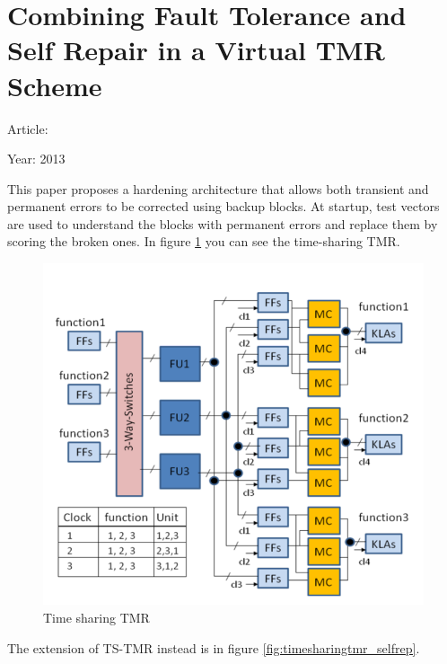 {	\section{Combining Fault Tolerance and Self Repair in a Virtual TMR Scheme}{
		Article: \cite{Combining_FT_and_self_repairing_virtual_TMR}
		
		Year: 2013
		
		This paper proposes a hardening architecture that allows both transient and permanent errors to be corrected using backup blocks. At startup, test vectors are used to understand the blocks with permanent errors and replace them by scoring the broken ones. In figure \ref{fig:timesharingtmr} you can see the time-sharing TMR.
		\begin{figure}[H]
			\centering
			\includegraphics[scale=0.3]{./images/Articles_image/Combining_FT_and_self_repairing_ST_TMR.png}
			\caption{Time sharing TMR}
			\label{fig:timesharingtmr}
		\end{figure}	
		The extension of TS-TMR instead is in figure \ref{fig:timesharingtmr_selfrep}.
		\begin{figure}[H]
			\centering

\end{figure}}}
